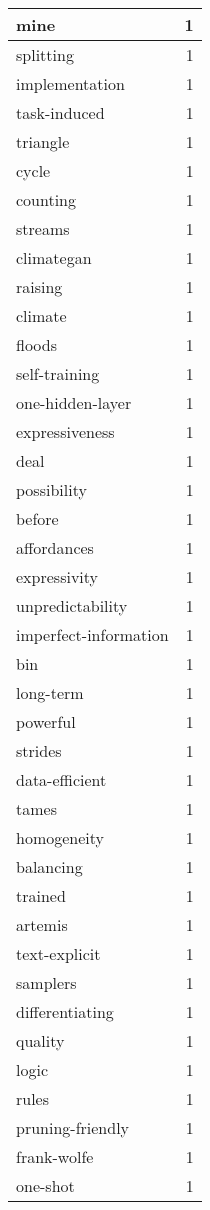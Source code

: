 \begin{table}[h]
\begin{tabular}{|l|r|}
\hline
mine & 1 \\
\hline
splitting & 1 \\
\hline
implementation & 1 \\
\hline
task-induced & 1 \\
\hline
triangle & 1 \\
\hline
cycle & 1 \\
\hline
counting & 1 \\
\hline
streams & 1 \\
\hline
climategan & 1 \\
\hline
raising & 1 \\
\hline
climate & 1 \\
\hline
floods & 1 \\
\hline
self-training & 1 \\
\hline
one-hidden-layer & 1 \\
\hline
expressiveness & 1 \\
\hline
deal & 1 \\
\hline
possibility & 1 \\
\hline
before & 1 \\
\hline
affordances & 1 \\
\hline
expressivity & 1 \\
\hline
unpredictability & 1 \\
\hline
imperfect-information & 1 \\
\hline
bin & 1 \\
\hline
long-term & 1 \\
\hline
powerful & 1 \\
\hline
strides & 1 \\
\hline
data-efficient & 1 \\
\hline
tames & 1 \\
\hline
homogeneity & 1 \\
\hline
balancing & 1 \\
\hline
trained & 1 \\
\hline
artemis & 1 \\
\hline
text-explicit & 1 \\
\hline
samplers & 1 \\
\hline
differentiating & 1 \\
\hline
quality & 1 \\
\hline
logic & 1 \\
\hline
rules & 1 \\
\hline
pruning-friendly & 1 \\
\hline
frank-wolfe & 1 \\
\hline
one-shot & 1 \\

\end{tabular}
\end{table}
